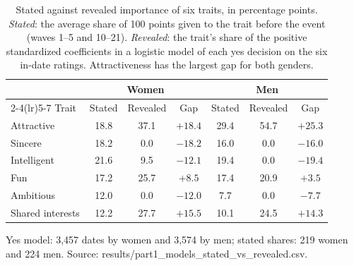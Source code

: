 \begin{table}[h]
\centering
\caption{Stated against revealed importance of six traits, in percentage points. \emph{Stated}: the average share of
100 points given to the trait before the event (waves 1--5 and 10--21). \emph{Revealed}: the trait's share of the
positive standardized coefficients in a logistic model of each yes decision on the six in-date ratings. Attractiveness
has the largest gap for both genders.}
\label{tab:stated}
\begin{tabular}{l ccc ccc}
\toprule
 & \multicolumn{3}{c}{Women} & \multicolumn{3}{c}{Men} \\
\cmidrule(lr){2-4}\cmidrule(lr){5-7}
Trait & Stated & Revealed & Gap & Stated & Revealed & Gap \\
\midrule
Attractive & 18.8 & 37.1 & $+18.4$ & 29.4 & 54.7 & $+25.3$ \\
Sincere & 18.2 & 0.0 & $-18.2$ & 16.0 & 0.0 & $-16.0$ \\
Intelligent & 21.6 & 9.5 & $-12.1$ & 19.4 & 0.0 & $-19.4$ \\
Fun & 17.2 & 25.7 & $+8.5$ & 17.4 & 20.9 & $+3.5$ \\
Ambitious & 12.0 & 0.0 & $-12.0$ & 7.7 & 0.0 & $-7.7$ \\
Shared interests & 12.2 & 27.7 & $+15.5$ & 10.1 & 24.5 & $+14.3$ \\
\bottomrule
\end{tabular}

\smallskip
{\footnotesize Yes model: 3,457 dates by women and 3,574 by men; stated shares: 219 women and 224 men. Source: results/part1\_models\_stated\_vs\_revealed.csv.}
\end{table}
